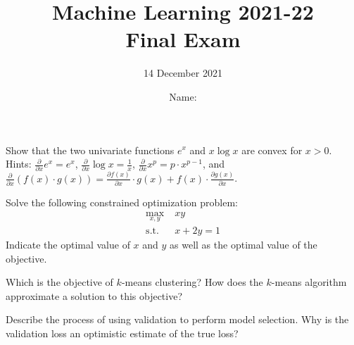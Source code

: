 \documentclass[11pt]{article}
\title{
\vspace{-1.2cm}
Machine Learning 2021-22\\ Final Exam}
\author{14 December 2021}
\date{Name: \dotfill}%
\newcounter{marks}
\begin{document}
\maketitle


\begin{list}{{\bf Question :}}
	{
	}

\item
{}
\addtocounter{marks}{2}
Show that the two univariate functions $e^x$ and $x\log x$ are convex for $x>0$.\\
Hints: $\frac \partial {\partial x} e^x = e^x$, $\frac \partial {\partial x} \log x = \frac 1 x$, $\frac \partial {\partial x} x^p = p \cdot x^{p-1}$, and $\frac \partial {\partial x} \left( f(x) \cdot g(x) \right) = \frac {\partial f(x)} {\partial x} \cdot g(x) + f(x) \cdot\frac {\partial g(x)} {\partial x}$.

\framebox[16cm][l]{ 
\parbox{15.9cm}{
\vspace*{7cm}
}}

\item
{}
\addtocounter{marks}{2}
Solve the following constrained optimization problem:
  \begin{align*}
	\max_{x,y} \; & xy\\
	\mathrm{s.t.} \; & x + 2y = 1
  \end{align*}
  Indicate the optimal value of $x$ and $y$ as well as the optimal value of the objective.

\framebox[16cm][l]{ 
\parbox{15.9cm}{
\vspace*{7cm}
}}

\pagebreak



\item
{}
\addtocounter{marks}{1}
Which is the objective of $k$-means clustering? How does the $k$-means algorithm approximate a solution to this objective?

\framebox[16cm][l]{ 
\parbox{15.9cm}{
\vspace*{6.2cm}
}}


\item
{}
\addtocounter{marks}{1}
Describe the process of using validation to perform model selection. Why is the validation loss an optimistic estimate of the true loss?

\framebox[16cm][l]{ 
\parbox{15.9cm}{
\vspace*{6.2cm}
}}


\end{list}
\end{document}
